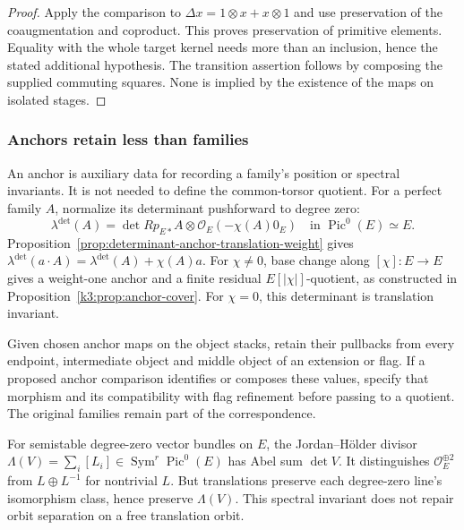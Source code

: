 \begin{proof}
Apply the comparison to
$\Delta x=1\otimes x+x\otimes1$ and use preservation of the
coaugmentation and coproduct. This proves preservation of
primitive elements. Equality with the whole target kernel needs
more than an inclusion, hence the stated additional hypothesis.
The transition assertion follows by composing the supplied
commuting squares. None is implied by the existence of the maps
on isolated stages.
\end{proof}

\subsubsection*{Anchors retain less than families}

An anchor is auxiliary data for recording a family's position or
spectral invariants. It is not needed to define the common-torsor
quotient. For a perfect family $A$, normalize its determinant
pushforward to degree zero:
\[
 \lambda^{\det}(A)=\det Rp_{E*}A\otimes\mathcal O_E(-\chi(A)0_E)
 \quad\text{in }\operatorname{Pic}^0(E)\simeq E.
\]
Proposition~\ref{prop:determinant-anchor-translation-weight} gives
$\lambda^{\det}(a\cdot A)=\lambda^{\det}(A)+\chi(A)a$.
For $\chi\ne0$, base change along $[\chi]:E\to E$ gives a
weight-one anchor and a finite residual $E[|\chi|]$-quotient,
as constructed in Proposition~\ref{k3:prop:anchor-cover}.
For $\chi=0$, this determinant is translation invariant.

\begin{definition}
\label{def:source-target-anchor-memory-datum}
Given chosen anchor maps on the object stacks, retain their
pullbacks from every endpoint, intermediate object and middle
object of an extension or flag. If a proposed anchor comparison
identifies or composes these values, specify that morphism and
its compatibility with flag refinement before passing to a
quotient. The original families remain part of the correspondence.
\end{definition}

For semistable degree-zero vector bundles on $E$, the
Jordan--H\"older divisor
$\Lambda(V)=\sum_i[L_i]\in\operatorname{Sym}^r\operatorname{Pic}^0(E)$
has Abel sum $\det V$. It distinguishes
$\mathcal O_E^{\oplus2}$ from $L\oplus L^{-1}$ for nontrivial
$L$. But translations preserve each degree-zero line's
isomorphism class, hence preserve $\Lambda(V)$.
This spectral invariant does not repair orbit separation on a
free translation orbit.


